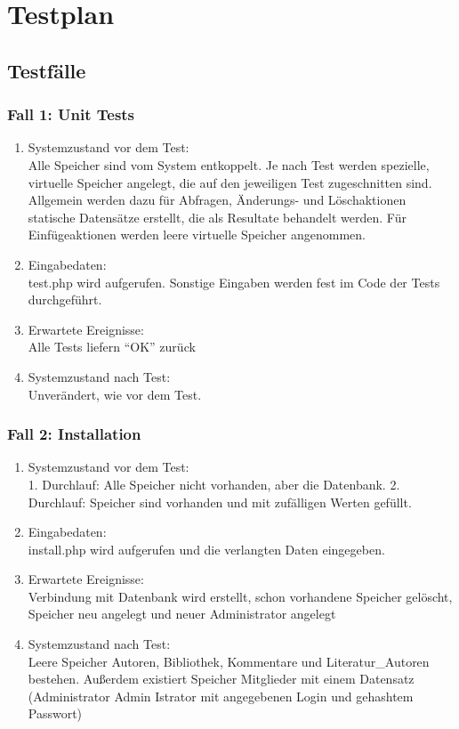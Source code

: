 \section{Testplan}
\subsection{Testfälle}

\subsubsection{Fall 1: Unit Tests}
\begin{enumerate}
\item Systemzustand vor dem Test:\\
	Alle Speicher sind vom System entkoppelt. Je nach Test werden spezielle, virtuelle Speicher angelegt, die auf den jeweiligen Test zugeschnitten sind. Allgemein werden dazu für Abfragen, Änderungs- und Löschaktionen statische Datensätze erstellt, die als Resultate behandelt werden. Für Einfügeaktionen werden leere virtuelle Speicher angenommen.
\item Eingabedaten:\\
	test.php wird aufgerufen. Sonstige Eingaben werden fest im Code der Tests durchgeführt.
\item Erwartete Ereignisse:\\
	Alle Tests liefern ``OK'' zurück
\item Systemzustand nach Test:\\
	Unverändert, wie vor dem Test.
\end{enumerate}

\subsubsection{Fall 2: Installation}
\begin{enumerate}
\item Systemzustand vor dem Test:\\
	1. Durchlauf: Alle Speicher nicht vorhanden, aber die Datenbank. 2. Durchlauf: Speicher sind vorhanden und mit zufälligen Werten gefüllt.
\item Eingabedaten:\\
	install.php wird aufgerufen und die verlangten Daten eingegeben.
\item Erwartete Ereignisse:\\
	Verbindung mit Datenbank wird erstellt, schon vorhandene Speicher gelöscht, Speicher neu angelegt und neuer Administrator angelegt
\item Systemzustand nach Test:\\
	Leere Speicher Autoren, Bibliothek, Kommentare und Literatur\_Autoren bestehen. Außerdem existiert Speicher Mitglieder mit einem Datensatz (Administrator Admin Istrator mit angegebenen Login und gehashtem Passwort)
\end{enumerate}

